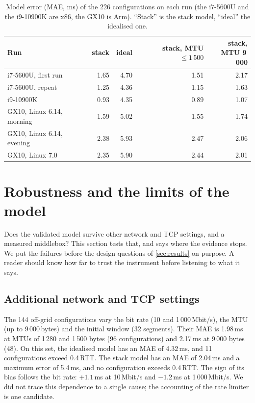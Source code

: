 \documentclass[preprint,12pt]{elsarticle}
\newcommand{\ms}{\,ms\xspace}
\newcommand{\Mbits}{\,Mbit/s\xspace}
\begin{document}
\begin{table}[t]
\centering\small
\caption{Model error (MAE, ms) of the 226 configurations on each run (the i7-5600U and the i9-10900K are x86, the GX10 is Arm). ``Stack'' is the stack model, ``ideal'' the idealised one.}
\label{tab:repl}
\begin{tabular}{@{}lrrrr@{}}
\toprule
Run & stack & ideal & \shortstack[r]{stack,\\MTU $\le 1\,500$} & \shortstack[r]{stack,\\MTU 9\,000}\\
\midrule
i7-5600U, first run & 1.65 & 4.70 & 1.51 & 2.17\\
i7-5600U, repeat & 1.25 & 4.36 & 1.15 & 1.63\\
i9-10900K & 0.93 & 4.35 & 0.89 & 1.07\\
GX10, Linux 6.14, morning & 1.59 & 5.02 & 1.55 & 1.74\\
GX10, Linux 6.14, evening & 2.38 & 5.93 & 2.47 & 2.06\\
GX10, Linux 7.0 & 2.35 & 5.90 & 2.44 & 2.01\\
\bottomrule
\end{tabular}
\end{table}

\section{Robustness and the limits of the model}
\label{sec:robust}

Does the validated model survive other network and TCP settings, and a measured middlebox? This section tests that, and says where the evidence stops. We put the failures before the design questions of \cref{sec:results} on purpose. A reader should know how far to trust the instrument before listening to what it says.

\subsection{Additional network and TCP settings}
The 144 off-grid configurations vary the bit rate (10 and 1\,000\Mbits), the MTU (up to 9\,000\,bytes) and the initial window (32 segments). Their MAE is 1.98\ms at MTUs of 1\,280 and 1\,500 bytes (96 configurations) and 2.17\ms at 9\,000 bytes (48). On this set, the idealised model has an MAE of 4.32\ms, and 11 configurations exceed 0.4\,RTT. The stack model has an MAE of 2.04\ms and a maximum error of 5.4\ms, and no configuration exceeds 0.4\,RTT. The sign of its bias follows the bit rate: $+1.1$\ms at 10\Mbits and $-1.2$\ms at 1\,000\Mbits. We did not trace this dependence to a single cause; the accounting of the rate limiter is one candidate.
\end{document}
